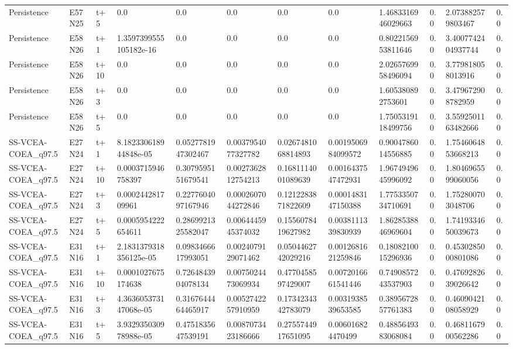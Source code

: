\begin{landscape}
\begin{longtable}{llllllllllll}
Persistence & E57N25 & t+5 & 0.0 & 0.0 & 0.0 & 0.0 & 0.0 & 1.4683316946029663 & 0.0 & 2.073882579803467 & 0.0 \\
Persistence & E58N26 & t+1 & 1.3597399555105182e-16 & 0.0 & 0.0 & 0.0 & 0.0 & 0.8022156953811646 & 0.0 & 3.4007742404937744 & 0.0 \\
Persistence & E58N26 & t+10 & 0.0 & 0.0 & 0.0 & 0.0 & 0.0 & 2.0265769958496094 & 0.0 & 3.779818058013916 & 0.0 \\
Persistence & E58N26 & t+3 & 0.0 & 0.0 & 0.0 & 0.0 & 0.0 & 1.605380892753601 & 0.0 & 3.479672908782959 & 0.0 \\
Persistence & E58N26 & t+5 & 0.0 & 0.0 & 0.0 & 0.0 & 0.0 & 1.7505319118499756 & 0.0 & 3.5592501163482666 & 0.0 \\
SS-VCEA-COEA\_q97.5 & E27N24 & t+1 & 8.182330618944848e-05 & 0.0527781947302467 & 0.0037954077327782 & 0.0267481068814893 & 0.0019506984099572 & 0.9004786014556885 & 0.0 & 1.7546064853668213 & 0.0 \\
SS-VCEA-COEA\_q97.5 & E27N24 & t+10 & 0.0003715946758397 & 0.3079595151679541 & 0.0027362812754213 & 0.1681114001089639 & 0.0016437547472931 & 1.9674949645996092 & 0.0 & 1.8046965599060056 & 0.0 \\
SS-VCEA-COEA\_q97.5 & E27N24 & t+3 & 0.000244281709961 & 0.2277604097167946 & 0.0002607044272846 & 0.1212283871822609 & 0.0001483147150388 & 1.7753350734710691 & 0.0 & 1.752800703048706 & 0.0 \\
SS-VCEA-COEA\_q97.5 & E27N24 & t+5 & 0.0005954222654611 & 0.2869921325582047 & 0.0064445945374032 & 0.1556078419627982 & 0.0038111339830939 & 1.8628538846969604 & 0.0 & 1.7419334650039673 & 0.0 \\
SS-VCEA-COEA\_q97.5 & E31N16 & t+1 & 2.1831379318356125e-05 & 0.0983466617993051 & 0.0024079129071462 & 0.0504462742029216 & 0.0012681621259846 & 0.1808210015296936 & 0.0 & 0.4530285000801086 & 0.0 \\
SS-VCEA-COEA\_q97.5 & E31N16 & t+10 & 0.0001027675174638 & 0.7264843904078134 & 0.0075024473069934 & 0.4770458597429007 & 0.0072016661541446 & 0.7490857243537903 & 0.0 & 0.4769282639026642 & 0.0 \\
SS-VCEA-COEA\_q97.5 & E31N16 & t+3 & 4.363605373147068e-05 & 0.3167644464465917 & 0.0052742257910959 & 0.1734234342783079 & 0.0031938539653585 & 0.3895672857761383 & 0.0 & 0.4609042108058929 & 0.0 \\
SS-VCEA-COEA\_q97.5 & E31N16 & t+5 & 3.932935030978988e-05 & 0.4751835647539191 & 0.0087073423186666 & 0.2755744917651095 & 0.006016824470499 & 0.4885649383068084 & 0.0 & 0.4681167900562286 & 0.0 \\

\end{longtable}
\end{landscape}

